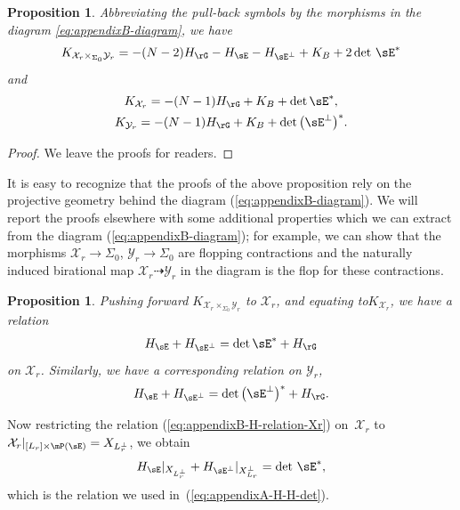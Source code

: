 \documentclass[10pt,a4paper]{amsart}
\numberwithin{equation}{section}
\newtheorem{Proposition}[Theorem]{Proposition}
\begin{document}
\begin{Proposition}\label{prop:appendixB-KKK} Abbreviating the pull-back symbols by the morphisms in the diagram \eqref{eq:appendixB-diagram}, we have
\begin{gather*}
K_{\mathcal{X}_{r}\times_{\Sigma_{0}}\mathcal{Y}_{r}}=-(N-2)H_{\rG}-H_{\sE}-H_{\sE^{\perp}}+K_{B}+2\det\,\sE^{*}
\end{gather*}
and
\begin{gather*}
 K_{\mathcal{X}_{r}}=-(N-1)H_{\rG}+K_{B}+\det \sE^{*},\\
 K_{\mathcal{Y}_{r}}=-(N-1)H_{\rG}+K_{B}+\det \big(\sE^{\perp}\big)^{*}.
\end{gather*}
\end{Proposition}
\begin{proof}We leave the proofs for readers.
\end{proof}

It is easy to recognize that the proofs of the above proposition rely on the projective geometry behind the diagram (\ref{eq:appendixB-diagram}). We will report the proofs elsewhere with some additional properties which we can extract from the diagram (\ref{eq:appendixB-diagram}); for example, we can show that the morphisms $\mathcal{X}_{r}\to\Sigma_{0}$, $\mathcal{Y}_{r}\to\Sigma_{0}$ are flopping contractions and the naturally induced birational map $\mathcal{X}_{r}\dashrightarrow\mathcal{Y}_{r}$ in the diagram is the flop for these contractions.
\begin{Proposition}\label{prop:appendixB-KKK2}Pushing forward $K_{\mathcal{X}_{r}\times_{\Sigma_{0}}\mathcal{Y}_{r}}$ to $\mathcal{X}_{r}$, and equating to$K_{\mathcal{X}_{r}}$, we have a relation
\begin{gather}
H_{\sE}+H_{\sE^{\perp}}=\det \sE^{*}+H_{\rG}\label{eq:appendixB-H-relation-Xr}
\end{gather}
on $\mathcal{X}_{r}$. Similarly, we have a corresponding relation on $\mathcal{Y}_{r}$,
\begin{gather*}
H_{\sE}+H_{\sE^{\perp}}=\det \big(\sE^{\perp}\big)^{*}+H_{\rG}.
\end{gather*}
\end{Proposition}

Now restricting the relation (\ref{eq:appendixB-H-relation-Xr}) on~$\mathcal{X}_{r}$ to $\mathcal{X}_{r}|_{[L_{r}]\times\mP(\sE)}=X_{L_{r}^{\perp}}$, we obtain
\begin{gather}
H_{\sE}|_{X_{L_{r}^{\perp}}}+H_{\sE^{\perp}}|_{X_{L_{r}}^{\perp}}=\det\,\sE^{*},\label{eq:appendixB-H-H-det}
\end{gather}
which is the relation we used in~(\ref{eq:appendixA-H-H-det}).
\end{document}
